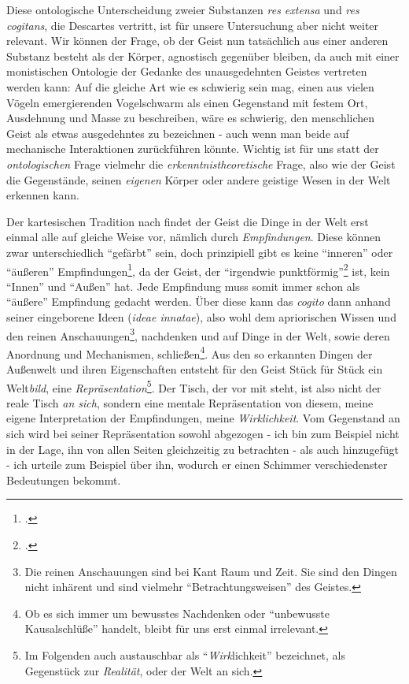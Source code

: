 \documentclass[a4paper, 12pt]{article}
\begin{document}
\begin{onehalfspace}
Diese ontologische Unterscheidung zweier Substanzen \emph{res extensa} und \emph{res cogitans}, die Descartes vertritt, ist für unsere Untersuchung aber nicht weiter relevant. Wir können der Frage, ob der Geist nun tatsächlich aus einer anderen Substanz besteht als der Körper, agnostisch gegenüber bleiben, da auch mit einer monistischen Ontologie der Gedanke des unausgedehnten Geistes vertreten werden kann: Auf die gleiche Art wie es schwierig sein mag, einen aus vielen Vögeln emergierenden Vogelschwarm als einen Gegenstand mit festem Ort, Ausdehnung und Masse zu beschreiben, wäre es schwierig, den menschlichen Geist als etwas ausgedehntes zu bezeichnen - auch wenn man beide auf mechanische Interaktionen zurückführen könnte. Wichtig ist für uns statt der \emph{ontologischen} Frage vielmehr die \emph{erkenntnistheoretische} Frage, also wie der Geist die Gegenstände, seinen \emph{eigenen} Körper oder andere geistige Wesen in der Welt erkennen kann.


Der kartesischen Tradition nach findet der Geist die Dinge in der Welt erst einmal alle auf gleiche Weise vor, nämlich durch \emph{Empfindungen}. Diese können zwar unterschiedlich "`gefärbt"' sein, doch prinzipiell gibt es keine "`inneren"' oder "`äußeren"' Empfindungen\footnote{\Cite[Vgl.][S. ?? (501?)]{scheler-ethik}.}, da der Geist, der "`irgendwie punktförmig"'\footnote{\Cite[Siehe][S. 270]{scheler-idole}.} ist, kein "`Innen"' und "`Außen"' hat. Jede Empfindung muss somit immer schon als "`äußere"' Empfindung gedacht werden. Über diese kann das \emph{cogito} dann anhand seiner eingeborene Ideen (\emph{ideae innatae}), also wohl dem apriorischen Wissen und den reinen Anschauungen\footnote{Die reinen Anschauungen sind bei Kant Raum und Zeit. Sie sind den Dingen nicht inhärent und sind vielmehr "`Betrachtungsweisen"' des Geistes.\citep[Vgl.]{sep-kant}}, nachdenken und auf Dinge in der Welt, sowie deren Anordnung und Mechanismen, schließen\footnote{Ob es sich immer um bewusstes Nachdenken oder "`unbewusste Kausalschlüße"' handelt, bleibt für uns erst einmal irrelevant.}. Aus den so erkannten Dingen der Außenwelt und ihren Eigenschaften entsteht für den Geist Stück für Stück ein Welt\emph{bild}, eine \emph{Repräsentation}\footnote{Im Folgenden auch austauschbar als "`\emph{Wirk}lichkeit"' bezeichnet, als Gegenstück zur \emph{Realität}, oder der Welt an sich.}. Der Tisch, der vor mit steht, ist also nicht der reale Tisch \emph{an sich}, sondern eine mentale Repräsentation von diesem, meine eigene Interpretation der Empfindungen, meine \emph{Wirklichkeit}. Vom Gegenstand an sich wird bei seiner Repräsentation sowohl abgezogen - ich bin zum Beispiel nicht in der Lage, ihn von allen Seiten gleichzeitig zu betrachten - als auch hinzugefügt - ich urteile zum Beispiel über ihn, wodurch er einen Schimmer verschiedenster Bedeutungen bekommt.


\end{onehalfspace}
\end{document}
